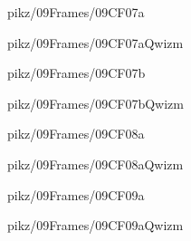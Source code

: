 \documentclass[9pt,xcolor={svgnames, x11names}]{beamer}
\begin{document}

\begin{frame}{pikz/09Frames/09CF07a}
  
\end{frame}


\begin{frame}{pikz/09Frames/09CF07aQwizm}
  
\end{frame}


\begin{frame}{pikz/09Frames/09CF07b}
  
\end{frame}


\begin{frame}{pikz/09Frames/09CF07bQwizm}
  
\end{frame}


\begin{frame}{pikz/09Frames/09CF08a}
  
\end{frame}


\begin{frame}{pikz/09Frames/09CF08aQwizm}
  
\end{frame}


\begin{frame}{pikz/09Frames/09CF09a}
  
\end{frame}


\begin{frame}{pikz/09Frames/09CF09aQwizm}
  
\end{frame}
\end{document}
